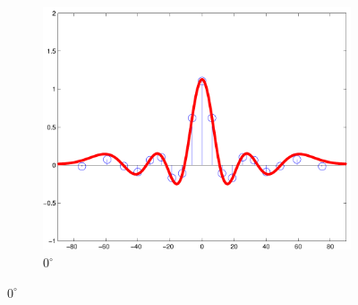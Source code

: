 \documentclass[spanish,openright]{book}
\begin{document}
\begin{figure}
  \centering
  \begin{subfigure}[b]{0.3\textwidth}
    \includegraphics[width=\textwidth]{Sim_seg025_ang090}
    \caption{$0^{\circ}$}
    \label{fig:Sim_ang090}
  \end{subfigure}



\end{figure}
\end{document}
